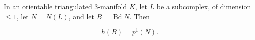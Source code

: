 In an orientable triangulated 3-manifold $K$, let $L$ be a subcomplex, of dimension $\leq 1$, let $N = N(L)$, and let $B = \operatorname{Bd} N$. Then

$$h(B) = p^1(N).$$

